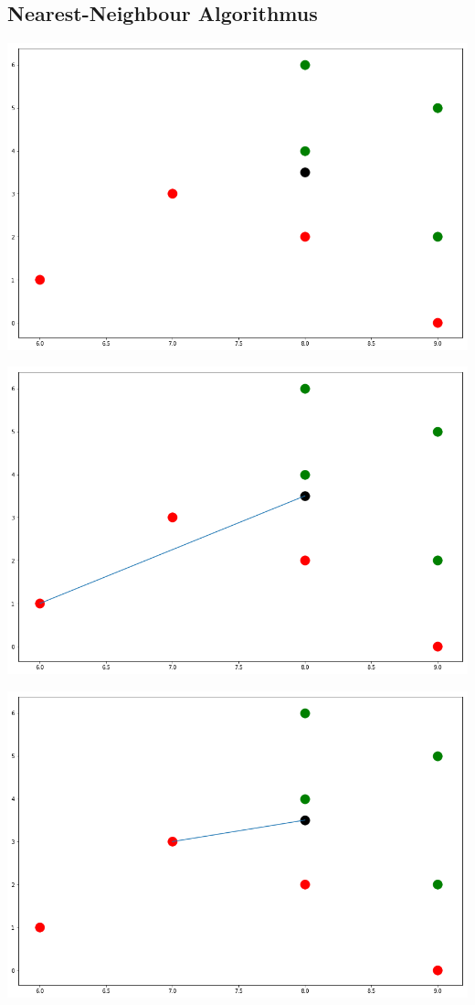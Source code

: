 \documentclass[a4paper]{scrartcl}
\begin{document}
\begin{multicols}{2}
            \subsection{Nearest-Neighbour Algorithmus}
                \includegraphics[width=\linewidth]{nn1.png}
                        
                \includegraphics[width=\linewidth]{nn2.png}
                        
                \includegraphics[width=\linewidth]{nn3.png}
                        

\end{multicols}
\end{document}
